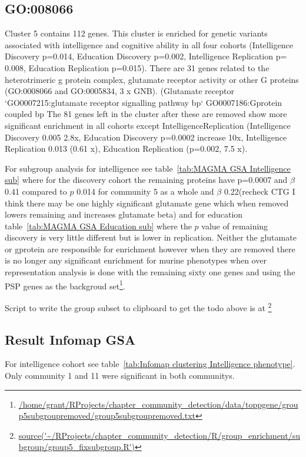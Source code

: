 \subsection{GO:008066}
Cluster 5 contains 112 genes. This cluster is enriched for genetic variants associated with intelligence and cognitive ability in all four cohorts (Intelligence Discovery p=0.014, Education Discovery p=0.002, Intelligence Replication p= 0.008, Education Replication p=0.015). There are 31 genes related to the heterotrimeric g protein complex, glutamate receptor activity or other G proteins (GO:0008066 and GO:0005834, 3 x GNB). (Glutamate receptor `GO0007215:glutamate receptor signalling pathway bp`  GO0007186:Gprotein coupled bp The 81 genes left in the cluster after these are removed show more significant enrichment in all cohorts except IntelligenceReplication  (Intelligence Discovery 0.005 2.8x, Education Discovery p=0.0002 increase 10x, Intelligence Replication 0.013 (0.61 x), Education Replication (p=0.002, 7.5 x).


For subgroup analysis for intelligence see table~\ref{tab:MAGMA GSA Intelligence sub} where for the discovery cohort the remaining proteins have p=0.0007 and $\beta$ 0.41 compared to $p$ 0.014 for community 5 as a whole and $\beta$ 0.22(recheck CTG I think there may be one highly significant glutamate gene which when removed lowers remaining and increases glutamate beta) and for education table~\ref{tab:MAGMA GSA Education sub} where the $p$ value of remaining discovery is very little different but is lower in replication. Neither the glutamate or gprotein are responsible for enrichment however when they are removed there is no longer any significant enrichment for murine phenotypes when over representation analysis is done with the remaining sixty one genes and using the PSP genes as the backgroud set\footnote{\tiny\url{/home/grant/RProjects/chapter_community_detection/data/toppgene/group5subgroupremoved/group5subgroupremoved.txt}}.


Script to write the group subset to clipboard to get the todo above is at \footnote{\tiny\url{source('~/RProjects/chapter_community_detection/R/group_enrichment/subgroup/group5_fixsubgroup.R')}}

\subsection{Result Infomap GSA}
\label{sec:result infomap gsa}
For intelligence cohort see table~\ref{tab:Infomap clustering Intelligence phenotype}. Only community 1 and 11 were significant in both communitys. 

